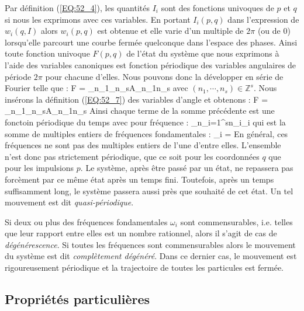 Par d\'{e}finition (\ref{EQ:52_4}), les quantit\'{e}s $I_{i}$ sont des fonctions univoques de $p$ et $q$ si nous les exprimons avec ces variables. En portant $I_{i}(p,q)$ dans l'expression de $w_{i}(q,I)$ alors $w_{i}(p,q)$ est obtenue et elle varie d'un multiple de $2\pi$ (ou de 0) lorsqu'elle parcourt une courbe ferm\'{e}e quelconque dans l'espace des phases.
Ainsi toute fonction univoque $F(p,q)$ de l'\'{e}tat du syst\`{e}me que nous exprimons \`{a} l'aide des variables canoniques est fonction p\'{e}riodique des variables angulaires de p\'{e}riode $2\pi$ pour chacune d'elles. Nous pouvons donc la d\'{e}velopper en s\'{e}rie de Fourier telle que :
\benn
	F = \sum_{n_{1}}\cdots\sum_{n_{s}}A_{n_{1}\cdots n_{s}}
\eenn
avec $(n_{1},\cdots,n_{s}) \in \mathbb{Z}^{s}$. Nous ins\'{e}rons la d\'{e}finition (\ref{EQ:52_7}) des variables d'angle et obtenons :
\be
	F = \sum_{n_{1}}\cdots\sum_{n_{s}}A_{n_{1}\cdots n_{s}} \label{EQ:52_9}
\ee
Ainsi chaque terme de la somme pr\'{e}c\'{e}dente est une fonctoin p\'{e}riodique du temps avec pour fr\'{e}quence :
\be
	\sum_{n_{i}=1}^{s}n_{i}\omega_{i} \label{EQ:52_10}
\ee
qui est la somme de multiples entiers de fr\'{e}quences fondamentales :
\be
	\omega_{i} =  \label{EQ:52_11}
\ee
En g\'{e}n\'{e}ral, ces fr\'{e}quences ne sont pas des multiples entiers de l'une d'entre elles. L'ensemble n'est donc pas strictement p\'{e}riodique, que ce soit pour les coordonn\'{e}es $q$ que pour les impulsions $p$. Le syst\`{e}me, apr\`{e}s \^{e}tre pass\'{e} par un \'{e}tat, ne repassera pas forc\`{e}ment par ce m\^{e}me \'{e}tat apr\`{e}s un temps fini. Toutefois, apr\`{e}s un temps suffisamment long, le syst\`{e}me passera aussi pr\`{e}s que souhait\'{e} de cet \'{e}tat. Un tel mouvement est dit \emph{quasi-p\'{e}riodique}.

Si deux ou plus des fr\'{e}quences fondamentales $\omega_{i}$ sont commensurables, i.e. telles que leur rapport entre elles est un nombre rationnel, alors il s'agit de cas de \emph{d\'{e}g\'{e}n\'{e}rescence}. Si toutes les fr\'{e}quences sont commensurables alors le mouvement du syst\`{e}me est dit \emph{compl\`{e}tement d\'{e}g\'{e}n\'{e}r\'{e}}. Dans ce dernier cas, le mouvement est rigoureusement p\'{e}riodique et la trajectoire de toutes les particules est ferm\'{e}e.

\subsection{Propri\'{e}t\'{e}s particuli\`{e}res}\label{PAR:52_2}

